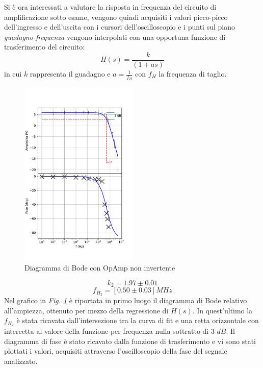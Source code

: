 \documentclass[journal]{IEEEtran}
\begin{document}
Si è ora interessati a valutare la risposta in frequenza del circuito di amplificazione sotto esame, vengono quindi acquisiti i valori picco-picco dell'ingresso e dell'uscita con i cursori dell'oscilloscopio e i punti sul piano \textit{guadagno-frequenza} vengono interpolati con una opportuna funzione di trasferimento del circuito:
\[H(s)=\frac{k}{(1+as)}\] 
in cui $k$ rappresenta il guadagno e $a = \frac{1}{f_H}$ con $f_H$ la frequenza di taglio.
\begin{figure}[H]%
\begin {center}
\includegraphics[width=0.50\textwidth]{analysis/output/OPA-bode_gain2(mag+phase).pdf}
\caption{Diagramma di Bode con OpAmp non invertente}
\label{fig:gain2}
\end {center}
\end{figure}
\[k_2 = 1.97 \pm 0.01\] 
\[f_{H_2} = [ 0.50 \pm 0.03 ]MHz\]
Nel grafico in \textit{Fig. \ref{fig:gain2}} è riportata in primo luogo il diagramma di Bode relativo all'ampiezza, ottenuto per mezzo della regressione di $H(s)$. In quest'ultimo la $f_H_2$ è stata ricavata dall'intersezione tra la curva di fit e una retta orizzontale con intercetta al valore della funzione per frequenza nulla sottratto di $3$ $dB$. Il diagramma di fase è stato ricavato dalla funzione di trasferimento e vi sono stati plottati i valori, acquisiti attraverso l'oscilloscopio della fase del segnale analizzato. 
\end{document}
